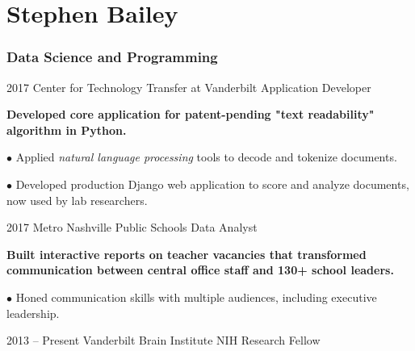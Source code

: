 \documentclass{tccv}
\begin{document}
\part{Stephen Bailey}

\section{Data Science and Programming}

\begin{eventlist}


\item{2017}
     {Center for Technology Transfer at Vanderbilt}
     {Application Developer}  
     
    \textbf{Developed core application for patent-pending "text readability" algorithm in Python.} 
    \newline

\begin{factlist}
    \item{$\bullet$}
         {Applied \textit{natural language processing} tools to decode and tokenize documents.}
         
    \item{$\bullet$}
         {Developed production Django web application to score and analyze documents, now used by lab researchers.}
\end{factlist}



\smallskip

\item{2017}
     {Metro Nashville Public Schools}
     {Data Analyst}

    \textbf{Built interactive reports on teacher vacancies that transformed communication between central office staff and 130+ school leaders.} \href{https://app.powerbi.com/view?r=eyJrIjoiZWVhMmIxMjUtOGM1Yi00MzQ4LWE4M2UtMzVlODA4N2NkNTVmIiwidCI6ImM2ODI4MjU3LTY0MTAtNDA3ZS1iNTU3LWI1ZGM3MjExZGU1NSIsImMiOjN9}{\color{blue}\Mundus}
    \newline

\begin{factlist}
    \item{$\bullet$}
        {Honed communication skills with multiple audiences, including executive leadership.}

\end{factlist}

\smallskip

\item{2013 -- Present}
     {Vanderbilt Brain Institute}
     {NIH Research Fellow}  
     

\end{eventlist}
\end{document}

